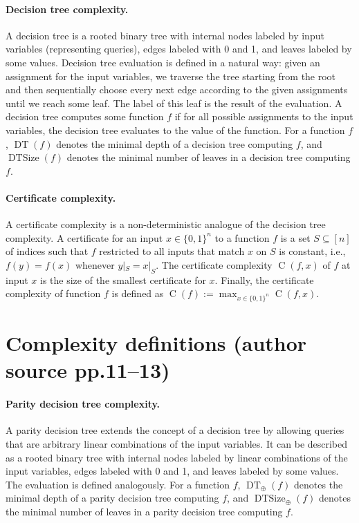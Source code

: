 \documentclass[10pt,a4paper]{article}
\newcommand{\bits}{\{0,1\}}
\newcommand{\DT}{\operatorname{DT}}
\newcommand{\DTSize}{\operatorname{DTSize}}
\newcommand{\CC}{\operatorname C}
\begin{document}
\paragraph{Decision tree complexity.} A decision tree is a rooted binary tree with internal nodes labeled by input variables (representing queries), edges labeled with 0 and 1, and leaves labeled by some values. Decision tree evaluation is defined in a natural way: given an assignment for the input variables, we traverse the tree starting from the root and then sequentially choose every next edge according to the given assignments until we reach some leaf. The label of this leaf is the result of the evaluation. A decision tree computes some function $f$ if for all possible assignments to the input variables, the decision tree evaluates to the value of the function. For a function $f$, $\DT(f)$ denotes the minimal depth of a decision tree computing $f$, and $\DTSize(f)$ denotes the minimal number of leaves in a decision tree computing $f$.
\paragraph{Certificate complexity.} A certificate complexity is a non-deterministic analogue of the decision tree complexity. A certificate for an input $x\in\bits^n$ to a function $f$ is a set $S\subseteq[n]$ of indices such that $f$ restricted to all inputs that match $x$ on $S$ is constant, i.e., $f(y)=f(x)$ whenever $y|_S=x|_S$. The certificate complexity $\CC(f,x)$ of $f$ at input $x$ is the size of the smallest certificate for $x$. Finally, the certificate complexity of function $f$ is defined as $\CC(f):=\max_{x\in\bits^n}\CC(f,x)$.

\section*{Complexity definitions (author source pp.11--13)}
\paragraph{Parity decision tree complexity.} A parity decision tree extends the concept of a decision tree by allowing queries that are arbitrary linear combinations of the input variables. It can be described as a rooted binary tree with internal nodes labeled by linear combinations of the input variables, edges labeled with 0 and 1, and leaves labeled by some values. The evaluation is defined analogously. For a function $f$, $\DT_\oplus(f)$ denotes the minimal depth of a parity decision tree computing $f$, and $\DTSize_\oplus(f)$ denotes the minimal number of leaves in a parity decision tree computing $f$.
\end{document}
